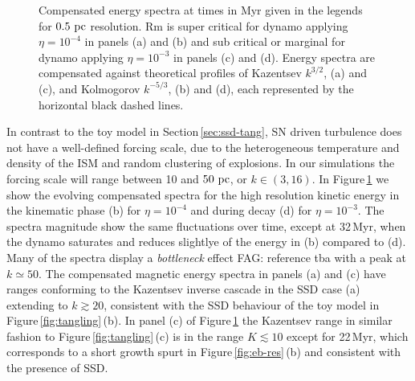 \documentclass[preprint2]{aastex63}
\newcommand\pc{~ {\rm pc}}
\newcommand{\fag}[1]{\textcolor{midgreen}{FAG: #1}}
\begin{document}
\begin{figure*}
\caption{
Compensated energy spectra at times in Myr given in the legends for 
$0.5\pc$ resolution.
Rm is super critical for dynamo applying $\eta=10^{-4}$ in
panels (a) and (b) and sub critical or marginal for dynamo applying
$\eta=10^{-3}$ in panels (c) and (d).
Energy spectra are compensated against theoretical profiles of Kazentsev
$k^{3/2}$, (a) and (c), and Kolmogorov $k^{-5/3}$, (b) and (d), 
each represented by the horizontal black dashed lines.
\label{fig:4power}}
\end{figure*}

In contrast to the toy model in Section\,\ref{sec:ssd-tang}, SN driven
turbulence does not have a well-defined forcing scale, due to the heterogeneous
temperature and density of the ISM and random clustering of explosions.
In our simulations the forcing scale will range between 10 and $50\pc$,
or $k\in(3,16)$.
In Figure\,\ref{fig:4power} we show the evolving compensated spectra for the
high resolution kinetic energy in the kinematic phase (b) for $\eta=10^{-4}$
and during decay (d) for $\eta=10^{-3}$.
The spectra magnitude show the same fluctuations over time, except at 32\,Myr,
when the dynamo saturates and reduces slightlye of the energy in (b) compared
to (d). 
Many of the spectra display a \emph{bottleneck} effect \fag{reference tba} with
a peak at $k\simeq50$.
The compensated magnetic energy spectra in panels (a) and (c) have ranges 
conforming to the Kazentsev inverse cascade in the SSD case (a) extending to
$k\gtrsim 20$, consistent with the SSD behaviour of the toy model in
Figure\,\ref{fig:tangling}\,(b).
In panel (c) of Figure\,\ref{fig:4power} the Kazentsev range in similar fashion
to Figure\,\ref{fig:tangling}\,(c) is in the range $K\lesssim10$ except
for 22\,Myr, which corresponds to a short growth spurt in
Figure\,\ref{fig:eb-res}\,(b) and consistent with the presence of SSD.
\end{document}
